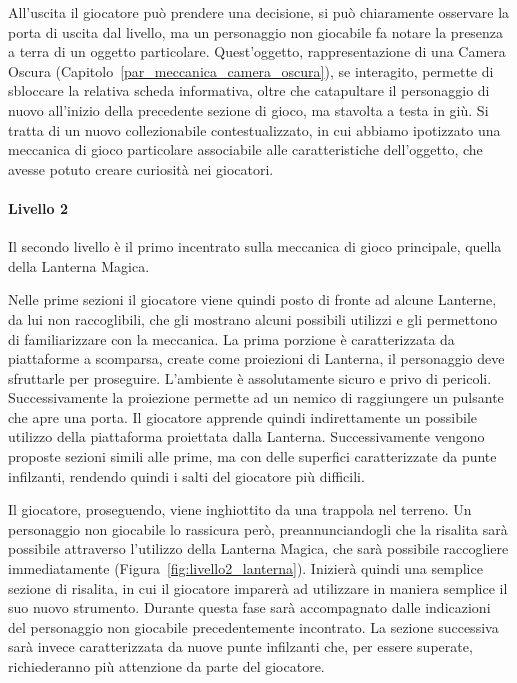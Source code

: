 All’uscita il giocatore può prendere una decisione, si può chiaramente osservare la porta di uscita dal livello, ma un personaggio non giocabile fa notare la presenza a terra di un oggetto particolare. Quest’oggetto, rappresentazione di una Camera Oscura (Capitolo~\ref{par_meccanica_camera_oscura}), se interagito, permette di sbloccare la relativa scheda informativa, oltre che catapultare il personaggio di nuovo all’inizio della precedente sezione di gioco, ma stavolta a testa in giù. Si tratta di un nuovo collezionabile contestualizzato, in cui abbiamo ipotizzato una meccanica di gioco particolare associabile alle caratteristiche dell’oggetto, che avesse potuto creare curiosità nei giocatori.

\paragraph{Livello 2}
\label{par:livello2}

Il secondo livello è il primo incentrato sulla meccanica di gioco principale, quella della Lanterna Magica.

Nelle prime sezioni il giocatore viene quindi posto di fronte ad alcune Lanterne, da lui non raccoglibili, che gli mostrano alcuni possibili utilizzi e gli permettono di familiarizzare con la meccanica.
La prima porzione è caratterizzata da piattaforme a scomparsa, create come proiezioni di Lanterna, il personaggio deve sfruttarle per proseguire. L’ambiente è assolutamente sicuro e privo di pericoli. Successivamente la proiezione permette ad un nemico di raggiungere un pulsante che apre una porta. Il giocatore apprende quindi indirettamente un possibile utilizzo della piattaforma proiettata dalla Lanterna. Successivamente vengono proposte sezioni simili alle prime, ma con delle superfici caratterizzate da punte infilzanti, rendendo quindi i salti del giocatore più difficili.

Il giocatore, proseguendo, viene inghiottito da una trappola nel terreno. Un personaggio non giocabile lo rassicura però, preannunciandogli che la risalita sarà possibile attraverso l’utilizzo della Lanterna Magica, che sarà possibile raccogliere immediatamente (Figura~\ref{fig:livello2_lanterna}). Inizierà quindi una semplice sezione di risalita, in cui il giocatore imparerà ad utilizzare in maniera semplice il suo nuovo strumento. Durante questa fase sarà accompagnato dalle indicazioni del personaggio non giocabile precedentemente incontrato. La sezione successiva sarà invece caratterizzata da nuove punte infilzanti che, per essere superate, richiederanno più attenzione da parte del giocatore.

